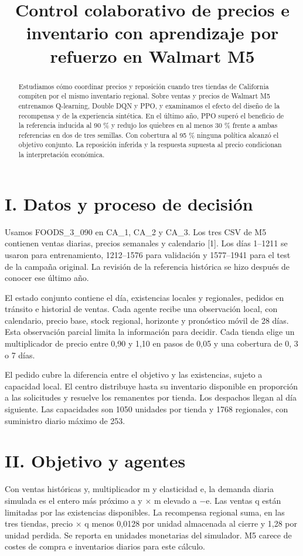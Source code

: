 \documentclass[conference]{IEEEtran}
\title{Control colaborativo de precios e inventario con aprendizaje por refuerzo en Walmart M5}
\author{\IEEEauthorblockN{Leonardo Candio y Dimael Rivas}\IEEEauthorblockA{Universidad de Ingeniería y Tecnología\\ DS5345, Grupo 1}}
\begin{document}
\maketitle
\begin{abstract}Estudiamos cómo coordinar precios y reposición cuando tres tiendas de California compiten por el mismo inventario regional. Sobre ventas y precios de Walmart M5 entrenamos Q-learning, Double DQN y PPO, y examinamos el efecto del diseño de la recompensa y de la experiencia sintética. En el último año, PPO superó el beneficio de la referencia inducida al 90 \% y redujo los quiebres en al menos 30 \% frente a ambas referencias en dos de tres semillas. Con cobertura al 95 \% ninguna política alcanzó el objetivo conjunto. La reposición inferida y la respuesta supuesta al precio condicionan la interpretación económica.\end{abstract}

\section*{I. Datos y proceso de decisión}
Usamos FOODS\_3\_090 en CA\_1, CA\_2 y CA\_3. Los tres CSV de M5 contienen ventas diarias, precios semanales y calendario [1]. Los días 1--1211 se usaron para entrenamiento, 1212--1576 para validación y 1577--1941 para el test de la campaña original. La revisión de la referencia histórica se hizo después de conocer ese último año.

El estado conjunto contiene el día, existencias locales y regionales, pedidos en tránsito e historial de ventas. Cada agente recibe una observación local, con calendario, precio base, stock regional, horizonte y pronóstico móvil de 28 días. Esta observación parcial limita la información para decidir. Cada tienda elige un multiplicador de precio entre 0,90 y 1,10 en pasos de 0,05 y una cobertura de 0, 3 o 7 días.

El pedido cubre la diferencia entre el objetivo y las existencias, sujeto a capacidad local. El centro distribuye hasta su inventario disponible en proporción a las solicitudes y resuelve los remanentes por tienda. Los despachos llegan al día siguiente. Las capacidades son 1050 unidades por tienda y 1768 regionales, con suministro diario máximo de 253.

\section*{II. Objetivo y agentes}
Con ventas históricas y, multiplicador m y elasticidad e, la demanda diaria simulada es el entero más próximo a y $\times$ m elevado a $-$e. Las ventas q están limitadas por las existencias disponibles. La recompensa regional suma, en las tres tiendas, precio $\times$ q menos 0,0128 por unidad almacenada al cierre y 1,28 por unidad perdida. Se reporta en unidades monetarias del simulador. M5 carece de costes de compra e inventarios diarios para este cálculo.
\end{document}

